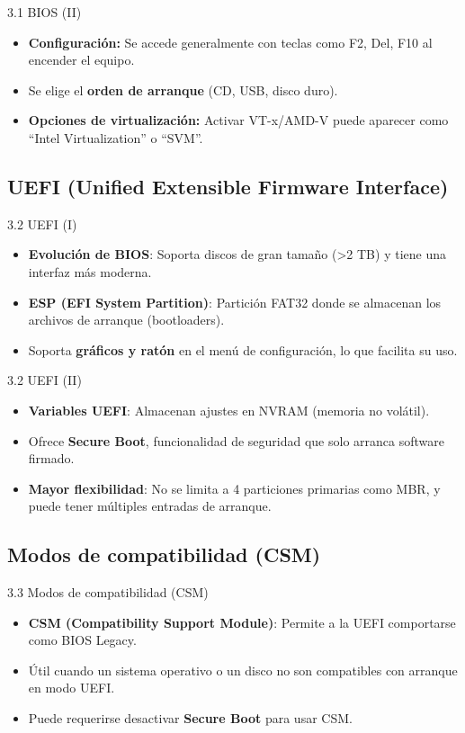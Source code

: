 \documentclass{beamer}
\begin{document}
\begin{frame}{3.1 BIOS (II)}
	\begin{itemize}
		\item \textbf{Configuración:} Se accede generalmente con teclas como F2, Del, F10 al encender el equipo.
		\item Se elige el \textbf{orden de arranque} (CD, USB, disco duro).
		\item \textbf{Opciones de virtualización:} Activar VT-x/AMD-V puede aparecer como “Intel Virtualization” o “SVM”.
	\end{itemize}
\end{frame}

\subsection{UEFI (Unified Extensible Firmware Interface)}
\begin{frame}{3.2 UEFI (I)}
	\begin{itemize}
		\item \textbf{Evolución de BIOS}: Soporta discos de gran tamaño (>2 TB) y tiene una interfaz más moderna.
		\item \textbf{ESP (EFI System Partition)}: Partición FAT32 donde se almacenan los archivos de arranque (bootloaders).
		\item Soporta \textbf{gráficos y ratón} en el menú de configuración, lo que facilita su uso.
	\end{itemize}
\end{frame}

\begin{frame}{3.2 UEFI (II)}
	\begin{itemize}
		\item \textbf{Variables UEFI}: Almacenan ajustes en NVRAM (memoria no volátil).
		\item Ofrece \textbf{Secure Boot}, funcionalidad de seguridad que solo arranca software firmado.
		\item \textbf{Mayor flexibilidad}: No se limita a 4 particiones primarias como MBR, y puede tener múltiples entradas de arranque.
	\end{itemize}
\end{frame}

\subsection{Modos de compatibilidad (CSM)}
\begin{frame}{3.3 Modos de compatibilidad (CSM)}
	\begin{itemize}
		\item \textbf{CSM (Compatibility Support Module)}: Permite a la UEFI comportarse como BIOS Legacy.
		\item Útil cuando un sistema operativo o un disco no son compatibles con arranque en modo UEFI.
		\item Puede requerirse desactivar \textbf{Secure Boot} para usar CSM.
	\end{itemize}
\end{frame}
\end{document}
